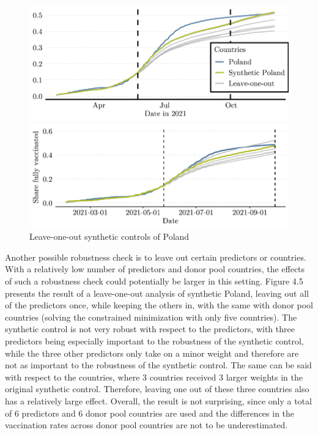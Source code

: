 \documentclass{scrbook}
\begin{document}
\begin{figure}[h]
\caption{Leave-one-out synthetic controls of Poland}

\begin{center}\includegraphics{bachelor_thesis_files/figure-latex/unnamed-chunk-6-1} \end{center}



\begin{center}\includegraphics{bachelor_thesis_files/figure-latex/unnamed-chunk-6-2} \end{center}
\end{figure}

Another possible robustness check is to leave out certain predictors or
countries. With a relatively low number of predictors and donor pool
countries, the effects of such a robustness check could potentially be
larger in this setting. Figure 4.5 presents the result of a
leave-one-out analysis of synthetic Poland, leaving out all of the
predictors once, while keeping the others in, with the same with donor
pool countries (solving the constrained minimization with only five
countries). The synthetic control is not very robust with respect to the
predictors, with three predictors being especially important to the
robustness of the synthetic control, while the three other predictors
only take on a minor weight and therefore are not as important to the
robustness of the synthetic control. The same can be said with respect
to the countries, where 3 countries received 3 larger weights in the
original synthetic control. Therefore, leaving one out of these three
countries also has a relatively large effect. Overall, the result is not
surprising, since only a total of 6 predictors and 6 donor pool
countries are used and the differences in the vaccination rates across
donor pool countries are not to be underestimated.
\end{document}
